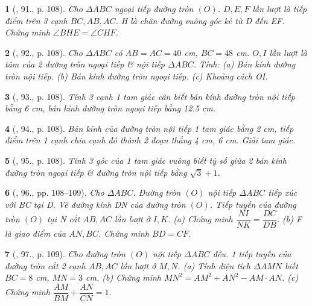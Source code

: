 \documentclass{article}
\newtheorem{baitoan}{}
\begin{document}
\begin{baitoan}[\cite{Binh_Toan_9_tap_1}, 91., p. 108]
	Cho $\Delta ABC$ ngoại tiếp đường tròn $(O)$. $D,E,F$ lần lượt là tiếp điểm trên 3 cạnh $BC,AB,AC$. H là chân đường vuông góc kẻ từ D đến EF. Chứng minh $\angle{BHE} = \angle{CHF}$.
\end{baitoan}

\begin{baitoan}[\cite{Binh_Toan_9_tap_1}, 92., p. 108]
	Cho $\Delta ABC$ có $AB = AC = 40$ {\rm cm}, $BC = 48$ {\rm cm}. $O,I$ lần lượt là tâm của 2 đường tròn ngoại tiếp \& nội tiếp $\Delta ABC$. Tính: (a) Bán kính đường tròn nội tiếp. (b) Bán kính đường tròn ngoại tiếp. (c) Khoảng cách OI.
\end{baitoan}

\begin{baitoan}[\cite{Binh_Toan_9_tap_1}, 93., p. 108]
	Tính 3 cạnh 1 tam giác cân biết bán kính đường tròn nội tiếp bằng {\rm6 cm}, bán kính đường tròn ngoại tiếp bằng {\rm12.5 cm}.
\end{baitoan}

\begin{baitoan}[\cite{Binh_Toan_9_tap_1}, 94., p. 108]
	Bán kính của đường tròn nội tiếp 1 tam giác bằng {\rm2 cm}, tiếp điểm trên 1 cạnh chia cạnh đó thành 2 đoạn thẳng {\rm4 cm, 6 cm}. Giải tam giác.
\end{baitoan}

\begin{baitoan}[\cite{Binh_Toan_9_tap_1}, 95., p. 108]
	Tính 3 góc của 1 tam giác vuông biết tỷ số giữa 2 bán kính đường tròn ngoại tiếp \& đường tròn nội tiếp bằng $\sqrt{3} + 1$.
\end{baitoan}

\begin{baitoan}[\cite{Binh_Toan_9_tap_1}, 96., pp. 108--109]
	Cho $\Delta ABC$. Đường tròn $(O)$ nội tiếp $\Delta ABC$ tiếp xúc với BC tại D. Vẽ đường kính DN của đường tròn $(O)$. Tiếp tuyến của đường tròn $(O)$ tại N cắt $AB,AC$ lần lượt ở $I,K$. (a) Chứng minh $\dfrac{NI}{NK} = \dfrac{DC}{DB}$. (b) F là giao điểm của $AN,BC$. Chứng minh $BD = CF$.
\end{baitoan}

\begin{baitoan}[\cite{Binh_Toan_9_tap_1}, 97., p. 109]
	Cho đường tròn $(O)$ nội tiếp $\Delta ABC$ đều. 1 tiếp tuyến của đường tròn cắt 2 cạnh $AB,AC$ lần lượt ở $M,N$. (a) Tính diện tích $\Delta AMN$ biết $BC = 8$ {\rm cm}, $MN = 3$ {\rm cm}. (b) Chứng minh $MN^2 = AM^2 + AN^2 - AM\cdot AN$. (c) Chứng minh $\dfrac{AM}{BM} + \dfrac{AN}{CN} = 1$.
\end{baitoan}
\end{document}
